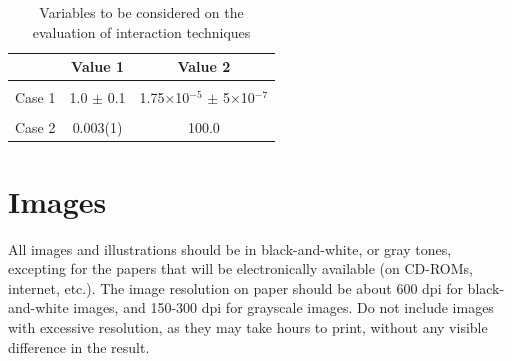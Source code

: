 \documentclass[12pt]{article}
\begin{document}
\begin{table}[ht]
\centering
\caption{Variables to be considered on the evaluation of interaction
  techniques}
\label{tab:exTable1}
\smallskip
\begin{tabular}{|l|c|c|}
\hline
& Value 1 & Value 2\\[0.5ex]
\hline
&&\\[-2ex]
Case 1 & 1.0 $\pm$ 0.1 & 1.75$\times$10$^{-5}$ $\pm$ 5$\times$10$^{-7}$\\[0.5ex]
\hline
&&\\[-2ex]
Case 2 & 0.003(1) & 100.0\\[0.5ex]
\hline
\end{tabular}
\end{table}

\section{Images}

All images and illustrations should be in black-and-white, or gray tones,
excepting for the papers that will be electronically available (on CD-ROMs,
internet, etc.). The image resolution on paper should be about 600 dpi for
black-and-white images, and 150-300 dpi for grayscale images.  Do not include
images with excessive resolution, as they may take hours to print, without any
visible difference in the result. 




\end{document}
